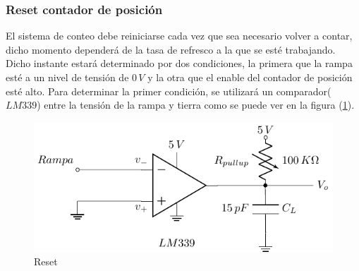 \subsubsection{Reset contador de posición}
El sistema de conteo debe reiniciarse cada vez que sea necesario volver a contar, dicho momento dependerá de la tasa de refresco a la que se esté trabajando. Dicho instante estará determinado por dos condiciones, la primera que la rampa esté a un nivel de tensión de $0\,V$ y la otra que el enable del contador de posición  esté alto. Para determinar la primer condición, se utilizará un comparador($LM339$) entre la tensión de la rampa y tierra como se puede ver en la figura (\ref{fig:Reset}).

\begin{figure}[H]
\centering
\includegraphics[scale=0.8]{Ejercicio8/Circuitos/Reset.pdf}
\caption{Reset}
\label{fig:Reset}
\end{figure}


